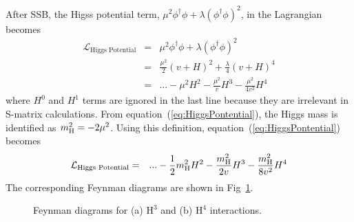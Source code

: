 After SSB, the Higss potential term,  
$\mu^2 \phi^\dagger \phi + \lambda \left( \phi^\dagger \phi \right)^2 $,
in the Lagrangian becomes 
\begin{eqnarray} 
\mathcal{L}_{\textrm{Higgs Potential}}
&=&   
\mu^2 \phi^\dagger \phi + \lambda \left( \phi^\dagger \phi \right)^2 \\ 
&=&   
\frac{\mu^2}{2} ( v + H )^2 + \frac{\lambda}{4} ( v + H )^4 \\ 
&=& 
\label{eq:HiggsPontential}
... - \mu^2 H^2 - \frac{\mu^2}{v} H^3  - \frac{\mu^2}{4v^2} H^4 
\end{eqnarray} 
where $H^0$ and $H^1$ terms are ignored in the last line
because they are irrelevant in S-matrix calculations. 
From equation~(\ref{eq:HiggsPontential}), the Higgs mass is identified 
as $m_{\mathrm{H}}^2 =  -2\mu^2$. %
Using this definition, equation~(\ref{eq:HiggsPontential}) becomes 
\begin{eqnarray} 
\mathcal{L}_{\textrm{Higgs Potential}}
&=& 
... - \frac{1}{2} m_{\mathrm{H}}^2 H^2 - \frac{m_{\mathrm{H}}^2}{2v} H^3  - \frac{m_{\mathrm{H}}^2}{8v^2} H^4    
\end{eqnarray}
The corresponding Feynman diagrams are shown in Fig~\ref{fig:fd_Hselfterm}. 
%
\begin{figure}[htp]
\centering
\vspace{1cm}
\hspace{1cm}
\caption{ Feynman diagrams for (a) $\textrm{H}^3$ and (b) $\textrm{H}^4$ interactions.
}
\vspace{0.5cm}
\label{fig:fd_Hselfterm}
\end{figure}

